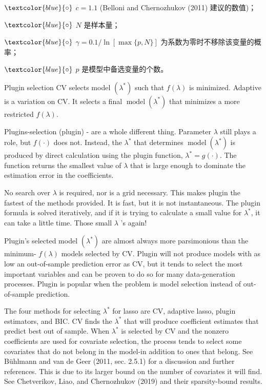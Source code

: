 $\textcolor{blue}{\circ}$ $c=1.1$ (Belloni and Chernozhukov (2011) 建议的数值)；

$\textcolor{blue}{\circ}$ $N$ 是样本量；

$\textcolor{blue}{\circ}$ $\gamma=0.1 / \ln [\max \{p, N\}]$ 为系数为零时不移除该变量的概率；

$\textcolor{blue}{\circ}$ $p$ 是模型中备选变量的个数。

\vspace{5pt}



\iffalse %


Plugin selection
CV selects model $\left(\lambda^{*}\right)$ such that $f(\lambda)$ is minimized. Adaptive is a variation on CV. It selects a final $\operatorname{model}\left(\lambda^{*}\right)$ that minimizes a more restricted $f(\lambda)$.

Plugins-selection (plugin) - are a whole different thing. Parameter $\lambda$ still plays a role, but $f(\cdot)$ does not. Instead, the $\lambda^{*}$ that determines $\operatorname{model}\left(\lambda^{*}\right)$ is produced by direct calculation using the plugin function, $\lambda^{*}=g(\cdot)$. The function returns the smallest value of $\lambda$ that is large enough to dominate the estimation error in the coefficients.

No search over $\lambda$ is required, nor is a grid necessary. This makes plugin the fastest of the methods provided. It is fast, but it is not instantaneous. The plugin formula is solved iteratively, and if it is trying to calculate a small value for $\lambda^{*}$, it can take a little time. Those small $\lambda$ 's again!

Plugin's selected model $\left(\lambda^{*}\right)$ are almost always more parsimonious than the minimum- $f(\lambda)$ models selected by CV. Plugin will not produce models with as low an out-of-sample prediction error as CV, but it tends to select the most important variables and can be proven to do so for many data-generation processes. Plugin is popular when the problem is model selection instead of out-of-sample prediction.

The four methods for selecting $\lambda^{*}$ for lasso are $\mathrm{CV}$, adaptive lasso, plugin estimators, and BIC. CV finds the $\lambda^{*}$ that will produce coefficient estimates that predict best out of sample. When $\lambda^{*}$ is selected by CV and the nonzero coefficients are used for covariate selection, the process tends to select some covariates that do not belong in the model-in addition to ones that belong. See Bühlmann and van de Geer (2011, sec. 2.5.1) for a discussion and further references. This is due to its larger bound on the number of covariates it will find. See Chetverikov, Liao, and Chernozhukov (2019) and their sparsity-bound results.

